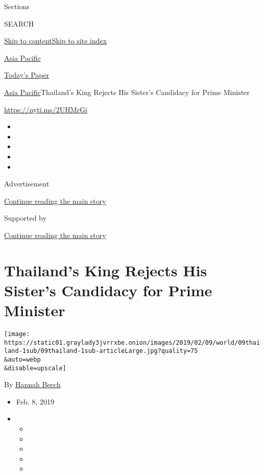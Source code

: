Sections

SEARCH

\protect\hyperlink{site-content}{Skip to
content}\protect\hyperlink{site-index}{Skip to site index}

\href{https://www.nytimes3xbfgragh.onion/section/world/asia}{Asia
Pacific}

\href{https://myaccount.nytimes3xbfgragh.onion/auth/login?response_type=cookie\&client_id=vi}{}

\href{https://www.nytimes3xbfgragh.onion/section/todayspaper}{Today's
Paper}

\href{/section/world/asia}{Asia Pacific}\textbar{}Thailand's King
Rejects His Sister's Candidacy for Prime Minister

\url{https://nyti.ms/2UHMrGi}

\begin{itemize}
\item
\item
\item
\item
\item
\end{itemize}

Advertisement

\protect\hyperlink{after-top}{Continue reading the main story}

Supported by

\protect\hyperlink{after-sponsor}{Continue reading the main story}

\hypertarget{thailands-king-rejects-his-sisters-candidacy-for-prime-minister}{%
\section{Thailand's King Rejects His Sister's Candidacy for Prime
Minister}\label{thailands-king-rejects-his-sisters-candidacy-for-prime-minister}}

\texttt{[image: https://static01.graylady3jvrrxbe.onion/images/2019/02/09/world/09thailand-1sub/09thailand-1sub-articleLarge.jpg?quality=75\\\&auto=webp\\\&disable=upscale]}

By \href{https://www.nytimes3xbfgragh.onion/by/hannah-beech}{Hannah
Beech}

\begin{itemize}
\item
  Feb. 8, 2019
\item
  \begin{itemize}
  \item
  \item
  \item
  \item
  \item
  \end{itemize}
\end{itemize}

